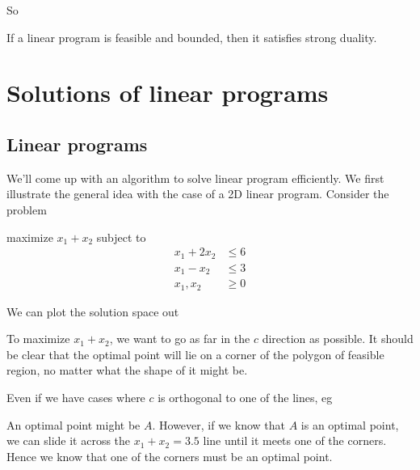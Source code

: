 \documentclass[a4paper]{article}
\begin{document}
So
\begin{thm}
  If a linear program is feasible and bounded, then it satisfies strong duality.
\end{thm}

\section{Solutions of linear programs}
\subsection{Linear programs}
We'll come up with an algorithm to solve linear program efficiently. We first illustrate the general idea with the case of a 2D linear program. Consider the problem
\begin{center}
  maximize $x_1 + x_2$ subject to
  \begin{align*}
    x_1 + 2x_2 &\leq 6\\
    x_1 - x_2 &\leq 3\\
    x_1, x_2 &\geq 0
  \end{align*}
\end{center}
We can plot the solution space out
\begin{center}
\end{center}
To maximize $x_1 + x_2$, we want to go as far in the $c$ direction as possible. It should be clear that the optimal point will lie on a corner of the polygon of feasible region, no matter what the shape of it might be.

Even if we have cases where $c$ is orthogonal to one of the lines, eg
\begin{center}
\end{center}
An optimal point might be $A$. However, if we know that $A$ is an optimal point, we can slide it across the $x_1 + x_2 = 3.5$ line until it meets one of the corners. Hence we know that one of the corners must be an optimal point.
\end{document}
